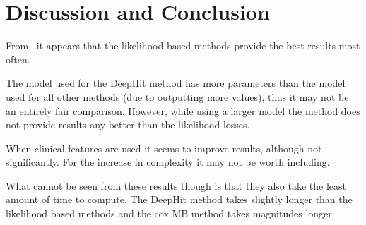 
\section{Discussion and Conclusion} \label{sec:discussion}
    From~ it appears that the likelihood based methods provide the best results most often.
    
    The model used for the DeepHit method has more parameters than the model used for all other methods (due to outputting more values), thus it may not be an entirely fair comparison. However, while using a larger model the method does not provide results any better than the likelihood losses.
    
    When clinical features are used it seems to improve results, although not significantly. For the increase in complexity it may not be worth including.
    
    What cannot be seen from these results though is that they also take the least amount of time to compute. The DeepHit method takes slightly longer than the likelihood based methods and the cox \gls{MB} method takes magnitudes longer.

